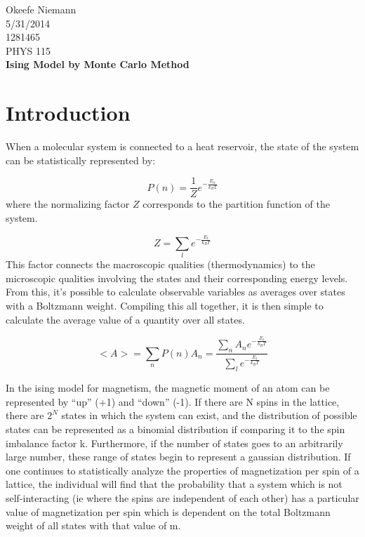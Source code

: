 \documentclass[10pt]{article}
\begin{document}
 
\begin{center}
\large
\hfill Okeefe Niemann\\
\hfill 5/31/2014\\
\hfill 1281465\\
\hfill PHYS 115 \\
\LARGE \textbf{Ising Model by Monte Carlo Method}\\
\end{center}
\normalsize
\section{Introduction}
When a molecular system is connected to a heat reservoir, the state of the system can be statistically represented by:

\begin{equation}
P(n) = \frac{1}{Z} e^{-\frac{E_n}{k_B T}}
\end{equation}
where the normalizing factor $Z$ corresponds to the partition function of the system.

$$Z = \sum\limits_{l} e^{-\frac{E_l}{k_B T}}$$
This factor connects the macroscopic qualities (thermodynamics) to the microscopic qualities involving the states and their corresponding energy levels. From this, it's possible to calculate observable variables as averages over states with a Boltzmann weight. Compiling this all together, it is then simple to calculate the average value of a quantity over all states.

\begin{equation}
<A>  =  \sum\limits_{n} P(n)A_n  =  \frac{\sum\limits_{n} A_n e^{-\frac{E_l}{k_B T}}}{\sum\limits_{l} e^{-\frac{E_l}{k_B T}}}
\end{equation}

In the ising model for magnetism, the magnetic moment of an atom can be represented by ``up'' (+1) and ``down'' (-1). If there are N spins in the lattice, there are $2^N$ states in which the system can exist, and the distribution of possible states can be represented as a binomial distribution if comparing it to the spin imbalance factor k. Furthermore, if the number of states goes to an arbitrarily large number, these range of states begin to represent a gaussian distribution. If one continues to statistically analyze the properties of magnetization per spin of a lattice, the individual will find that the probability that a system which is not self-interacting (ie where the spins are independent of each other) has a particular value of magnetization per spin which is dependent on the total Boltzmann weight of all states with that value of m.
\end{document}
